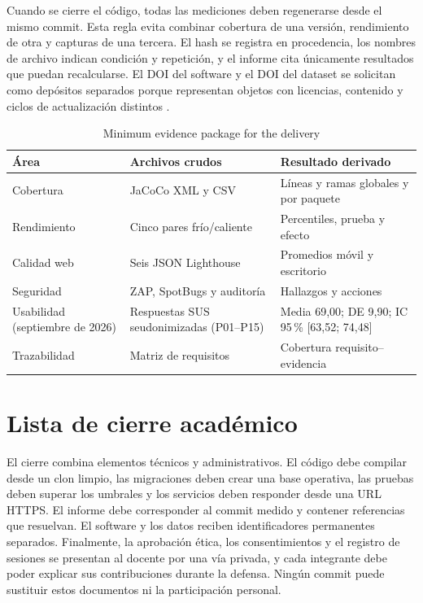 \documentclass[11pt,a4paper]{report}
\begin{document}
Cuando se cierre el código, todas las mediciones deben regenerarse desde el mismo
commit. Esta regla evita combinar cobertura de una versión, rendimiento de otra y
capturas de una tercera. El hash se registra en procedencia, los nombres de archivo
indican condición y repetición, y el informe cita únicamente resultados que puedan
recalcularse. El DOI del software y el DOI del dataset se solicitan como depósitos
separados porque representan objetos con licencias, contenido y ciclos de actualización
distintos \cite{smith2016software}.

\begin{table}[htbp]
\centering
\caption{Minimum evidence package for the delivery}
\begin{tabularx}{\textwidth}{p{3.0cm}X X}
\toprule
\textbf{Área} & \textbf{Archivos crudos} & \textbf{Resultado derivado} \\
\midrule
Cobertura & JaCoCo XML y CSV & Líneas y ramas globales y por paquete \\
Rendimiento & Cinco pares frío/caliente & Percentiles, prueba y efecto \\
Calidad web & Seis JSON Lighthouse & Promedios móvil y escritorio \\
Seguridad & ZAP, SpotBugs y auditoría & Hallazgos y acciones \\
Usabilidad (septiembre de 2026) & Respuestas SUS seudonimizadas (P01--P15) & Media 69,00; DE 9,90; IC 95\,\% [63,52; 74,48] \\
Trazabilidad & Matriz de requisitos & Cobertura requisito--evidencia \\
\bottomrule
\end{tabularx}
\end{table}

\section{Lista de cierre académico}

El cierre combina elementos técnicos y administrativos. El código debe compilar desde
un clon limpio, las migraciones deben crear una base operativa, las pruebas deben
superar los umbrales y los servicios deben responder desde una URL HTTPS. El informe
debe corresponder al commit medido y contener referencias que resuelvan. El software
y los datos reciben identificadores permanentes separados. Finalmente, la aprobación
ética, los consentimientos y el registro de sesiones se presentan al docente por una
vía privada, y cada integrante debe poder explicar sus contribuciones durante la
defensa. Ningún commit puede sustituir estos documentos ni la participación personal.
\end{document}
